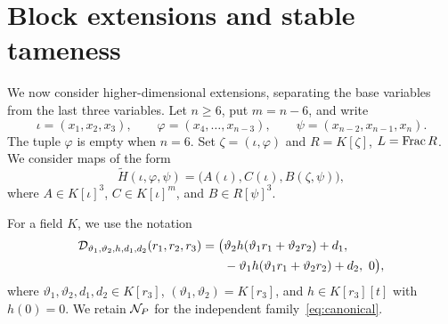 \section{Block extensions and stable tameness}\label{sec:blocks}

We now consider higher-dimensional extensions, separating the base variables from the last three variables. Let $n\geq6$, put $m=n-6$, and write
\[
 \iota=(x_1,x_2,x_3),\qquad \varphi=(x_4,\ldots,x_{n-3}),\qquad
 \psi=(x_{n-2},x_{n-1},x_n).
\]
The tuple $\varphi$ is empty when $n=6$. Set $\zeta=(\iota,\varphi)$ and $R=K[\zeta]$, $L=\operatorname{Frac} R$. We consider maps of the form
\begin{equation}\label{eq:block-map}
 \widetilde H(\iota,\varphi,\psi)=\bigl(A(\iota),C(\iota),B(\zeta,\psi)\bigr),
\end{equation}
where $A\in K[\iota]^3$, $C\in K[\iota]^m$, and $B\in R[\psi]^3$.

For a field $K$, we use the notation
\begin{equation}\label{eq:D-family}
 \begin{aligned}
 \mathcal D_{\vartheta_1,\vartheta_2,h,d_1,d_2}(r_1,r_2,r_3)
 =\bigl(&\vartheta_2h(\vartheta_1r_1+\vartheta_2r_2)+d_1,\\
       &-\vartheta_1h(\vartheta_1r_1+\vartheta_2r_2)+d_2,\ 0\bigr),
 \end{aligned}
\end{equation}
where $\vartheta_1,\vartheta_2,d_1,d_2\in K[r_3]$, $(\vartheta_1,\vartheta_2)=K[r_3]$, and $h\in K[r_3][t]$ with $h(0)=0$. We retain $\mathcal N_P$ for the independent family~\eqref{eq:canonical}.

